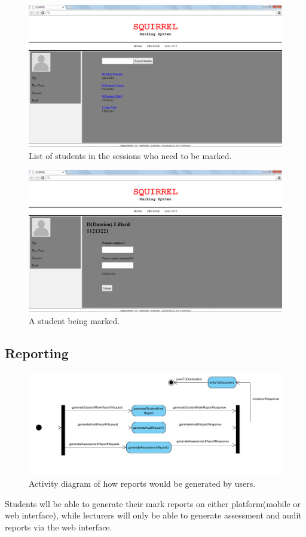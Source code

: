 \documentclass[11pt,a4paper]{article}
\begin{document}
		\begin{figure}[h!]
		\centering
		\includegraphics[width=1.0\linewidth]{./web_searchStudent}
		\caption{List of students in the sessions who need to be marked.}
		\label{fig:web_searchStudent}
		\end{figure}
		
\pagebreak
				\begin{figure}[h!]
				\centering
				\includegraphics[width=1.0\linewidth]{./web_markStudent}
				\caption{A student being marked.}
				\label{fig:web_markStudent}
				\end{figure}

\subsection{Reporting}
	\begin{figure}[h]
	\centering
	\includegraphics[width=1.0\linewidth]{./uml_reportGenerating}
	\caption{Activity diagram of how reports would be generated by users.}
	\label{fig:uml_reportGenerating}
	\end{figure}
Students wll be able to generate their mark reports on either platform(mobile or web interface), while lecturers will only be able to generate assessment and audit reports via the web interface.
\pagebreak
\end{document}
